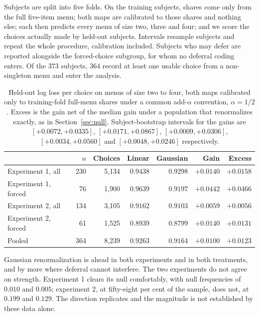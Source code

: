 \documentclass[11pt]{article}
\begin{document}
Subjects are split into five folds. On the training subjects, shares come only from the full
five-item menu; both maps are calibrated to those shares and nothing else; each then predicts
every menu of size two, three and four; and we score the choices actually made by held-out
subjects. Intervals resample subjects and repeat the whole procedure, calibration included.
Subjects who may defer are reported alongside the forced-choice subgroup, for whom no
deferral coding enters. Of the $373$ subjects, $364$ record at least one usable choice from a
non-singleton menu and enter the analysis.

\begin{table}[ht]
\centering
\small
\begin{tabular}{lrrrrrr}
\toprule
& $n$ & Choices & Linear & Gaussian & Gain & Excess \\
\midrule
Experiment 1, all & 230 & 5{,}134 & $0.9438$ & $0.9298$ & $+0.0140$ & $+0.0158$ \\
Experiment 1, forced & 76 & 1{,}900 & $0.9639$ & $0.9197$ & $+0.0442$ & $+0.0466$ \\
Experiment 2, all & 134 & 3{,}105 & $0.9162$ & $0.9103$ & $+0.0059$ & $+0.0056$ \\
Experiment 2, forced & 61 & 1{,}525 & $0.8939$ & $0.8799$ & $+0.0140$ & $+0.0131$ \\
\midrule
Pooled & 364 & 8{,}239 & $0.9263$ & $0.9164$ & $+0.0100$ & $+0.0123$ \\
\bottomrule
\end{tabular}
\caption{Held-out log loss per choice on menus of size two to four, both maps calibrated only
to training-fold full-menu shares under a common add-$\alpha$ convention, $\alpha = 1/2$.
Excess is the gain net of the median gain under a population that renormalizes exactly, as in
Section~\ref{sec:null}. Subject-bootstrap intervals for the gains are
$[+0.0072, +0.0335]$, $[+0.0171, +0.0867]$, $[+0.0009, +0.0306]$, $[+0.0034, +0.0560]$ and
$[+0.0048, +0.0246]$ respectively.}
\label{tab:menus}
\end{table}

Gaussian renormalization is ahead in both experiments and in both treatments, and by more where deferral
cannot interfere. The two experiments do not agree on strength. Experiment 1 clears its null
comfortably, with null frequencies of $0.010$ and $0.005$; experiment 2, at
fifty-eight per cent of the sample, does not, at $0.199$ and $0.129$. The direction
replicates and the magnitude is not established by these data alone.
\end{document}
